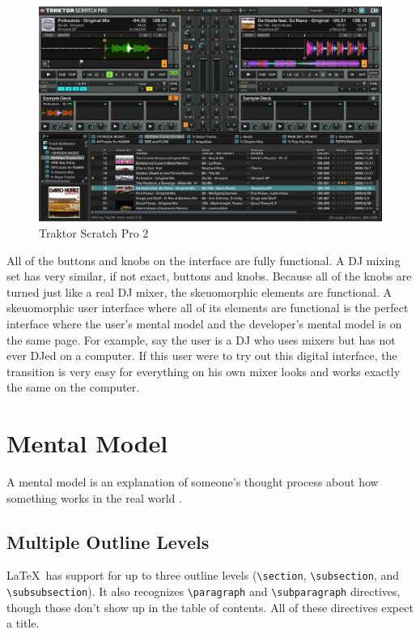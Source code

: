 \documentclass{article}
\begin{document}
\begin{figure}[H]
\centering
\includegraphics[width=4.5in]{traktorUI.jpg} 

\caption{Traktor Scratch Pro 2}
\label{traktor}
\end{figure}

All of the buttons and knobs on the interface are fully functional.  A DJ mixing set has very similar, if not exact, buttons and knobs.  Because all of the knobs are turned just like a real DJ mixer, the skeuomorphic elements are functional.  A skeuomorphic user interface where all of its elements are functional is the perfect interface where the user's mental model and the developer's mental model is on the same page.  For example, say the user is a DJ who uses mixers but has not ever DJed on a computer.  If this user were to try out this digital interface, the transition is very easy for everything on his own mixer looks and works exactly the same on the computer.

\section{Mental Model}

A mental model is an explanation of someone's thought process about how something works in the real world \cite{wiki-mental}.


\subsection{Multiple Outline Levels}

\LaTeX\ has support for up to three outline levels (\verb!\section!, \verb!\subsection!, and \verb!\subsubsection!).  It also recognizes \verb!\paragraph! and \verb!\subparagraph! directives, though those don't show up in the table of contents.  All of these directives expect a title.
\end{document}
